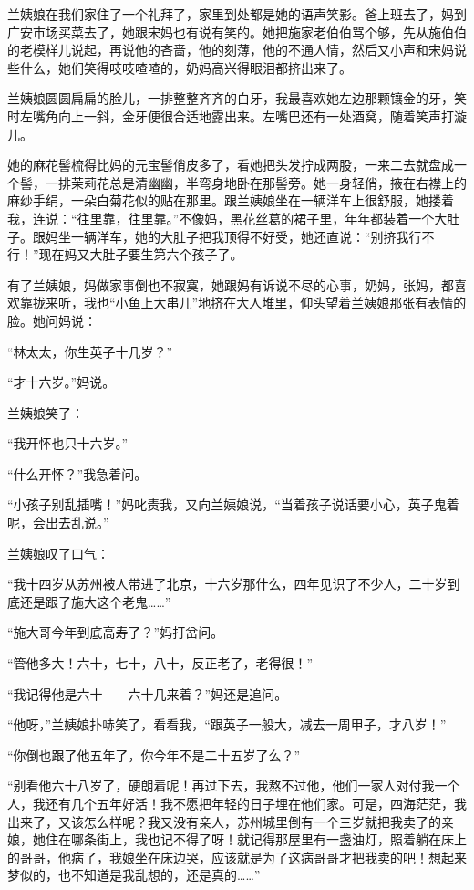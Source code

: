 \par 兰姨娘在我们家住了一个礼拜了，家里到处都是她的语声笑影。爸上班去了，妈到广安市场买菜去了，她跟宋妈也有说有笑的。她把施家老伯伯骂个够，先从施伯伯的老模样儿说起，再说他的吝啬，他的刻薄，他的不通人情，然后又小声和宋妈说些什么，她们笑得吱吱喳喳的，奶妈高兴得眼泪都挤出来了。
\par 兰姨娘圆圆扁扁的脸儿，一排整整齐齐的白牙，我最喜欢她左边那颗镶金的牙，笑时左嘴角向上一斜，金牙便很合适地露出来。左嘴巴还有一处酒窝，随着笑声打漩儿。
\par 她的麻花髻梳得比妈的元宝髻俏皮多了，看她把头发拧成两股，一来二去就盘成一个髻，一排茉莉花总是清幽幽，半弯身地卧在那髻旁。她一身轻俏，掖在右襟上的麻纱手绢，一朵白菊花似的贴在那里。跟兰姨娘坐在一辆洋车上很舒服，她搂着我，连说：“往里靠，往里靠。”不像妈，黑花丝葛的裙子里，年年都装着一个大肚子。跟妈坐一辆洋车，她的大肚子把我顶得不好受，她还直说：“别挤我行不行！”现在妈又大肚子要生第六个孩子了。
\par 有了兰姨娘，妈做家事倒也不寂寞，她跟妈有诉说不尽的心事，奶妈，张妈，都喜欢靠拢来听，我也“小鱼上大串儿”地挤在大人堆里，仰头望着兰姨娘那张有表情的脸。她问妈说：
\par “林太太，你生英子十几岁？”
\par “才十六岁。”妈说。
\par 兰姨娘笑了：
\par “我开怀也只十六岁。”
\par “什么开怀？”我急着问。
\par “小孩子别乱插嘴！”妈叱责我，又向兰姨娘说，“当着孩子说话要小心，英子鬼着呢，会出去乱说。”
\par 兰姨娘叹了口气：
\par “我十四岁从苏州被人带进了北京，十六岁那什么，四年见识了不少人，二十岁到底还是跟了施大这个老鬼……”
\par “施大哥今年到底高寿了？”妈打岔问。
\par “管他多大！六十，七十，八十，反正老了，老得很！”
\par “我记得他是六十——六十几来着？”妈还是追问。
\par “他呀，”兰姨娘扑哧笑了，看看我，“跟英子一般大，减去一周甲子，才八岁！”
\par “你倒也跟了他五年了，你今年不是二十五岁了么？”
\par “别看他六十八岁了，硬朗着呢！再过下去，我熬不过他，他们一家人对付我一个人，我还有几个五年好活！我不愿把年轻的日子埋在他们家。可是，四海茫茫，我出来了，又该怎么样呢？我又没有亲人，苏州城里倒有一个三岁就把我卖了的亲娘，她住在哪条街上，我也记不得了呀！就记得那屋里有一盏油灯，照着躺在床上的哥哥，他病了，我娘坐在床边哭，应该就是为了这病哥哥才把我卖的吧！想起来梦似的，也不知道是我乱想的，还是真的……”
